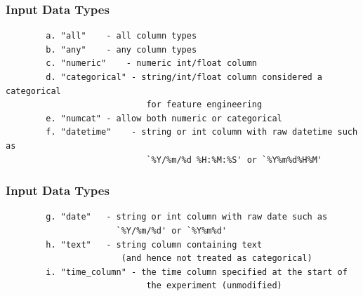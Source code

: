 \documentclass[11pt,
aspectratio=169,
hyperref={colorlinks}
]{beamer}
\begin{document}
\begin{frame}[fragile]
        \frametitle{Input Data Types}
        \begin{verbatim}
        a. "all"    - all column types
        b. "any"    - any column types
        c. "numeric"    - numeric int/float column
        d. "categorical" - string/int/float column considered a categorical 
                            for feature engineering
        e. "numcat" - allow both numeric or categorical
        f. "datetime"    - string or int column with raw datetime such as 
                            `%Y/%m/%d %H:%M:%S' or `%Y%m%d%H%M'
        \end{verbatim}
\end{frame}
\begin{frame}[fragile]
        \frametitle{Input Data Types}
        \begin{verbatim}
        g. "date"   - string or int column with raw date such as 
                      `%Y/%m/%d' or `%Y%m%d'
        h. "text"   - string column containing text 
                       (and hence not treated as categorical)
        i. "time_column" - the time column specified at the start of 
                            the experiment (unmodified)
        \end{verbatim}
\end{frame}
\end{document}

